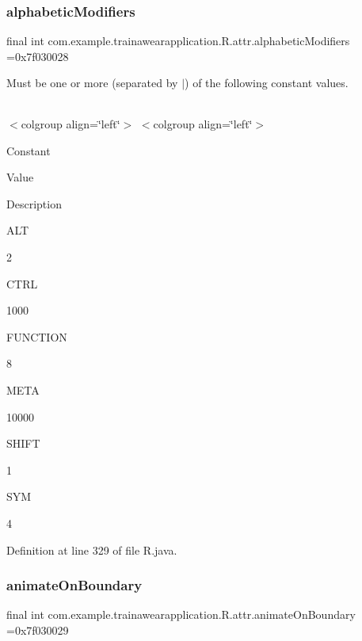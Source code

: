 \subsubsection{\texorpdfstring{alphabeticModifiers}{alphabeticModifiers}}
{\footnotesize\ttfamily final int com.\+example.\+trainawearapplication.\+R.\+attr.\+alphabetic\+Modifiers =0x7f030028\hspace{0.3cm}{\ttfamily [static]}}

Must be one or more (separated by \textquotesingle{}$\vert$\textquotesingle{}) of the following constant values.

\tabulinesep=1mm
\begin{longtabu}spread 0pt [c]{*{0}{|X[-1]}|}
\hline
\end{longtabu}
$<$colgroup align=\char`\"{}left\char`\"{}$>$ $<$colgroup align=\char`\"{}left\char`\"{}$>$ 

Constant

Value

Description 

A\+LT

2

C\+T\+RL

1000

F\+U\+N\+C\+T\+I\+ON

8

M\+E\+TA

10000

S\+H\+I\+FT

1

S\+YM

4

Definition at line 329 of file R.\+java.

\mbox{\label{classcom_1_1example_1_1trainawearapplication_1_1_r_1_1attr_a432a000c59a38764c044a159ceb8b590}} 
\subsubsection{\texorpdfstring{animateOnBoundary}{animateOnBoundary}}
{\footnotesize\ttfamily final int com.\+example.\+trainawearapplication.\+R.\+attr.\+animate\+On\+Boundary =0x7f030029\hspace{0.3cm}{\ttfamily [static]}}

